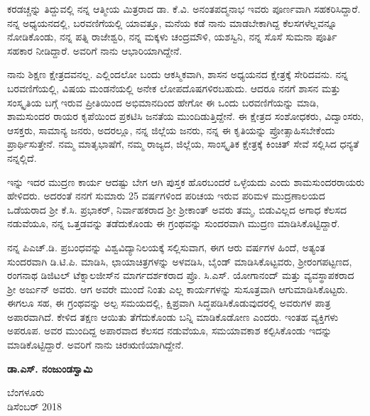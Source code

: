 ಕರಡಚ್ಚನ್ನು ತಿದ್ದುವಲ್ಲಿ ನನ್ನ ಆತ್ಮೀಯ ಮಿತ್ರರಾದ ಡಾ. ಕೆ.ವಿ. ಅನಂತಪದ್ಮನಾಭ ಇವರು ಪೂರ್ಣವಾಗಿ ಸಹಕರಿಸಿದ್ದಾರೆ. ನನ್ನ ಅಧ್ಯಯನದಲ್ಲಿ, ಬರವಣಿಗೆಯಲ್ಲಿ ಯಾವತ್ತೂ, ಮನೆಯ ಕಡೆ ನಾನು ಮಾಡಬೇಕಾಗಿದ್ದ ಕೆಲಸಗಳೆಲ್ಲವನ್ನೂ ನೋಡಿಕೊಂಡು, ನನ್ನ ಪತ್ನಿ ರಾಜೇಶ್ವರಿ, ನನ್ನ ಮಕ್ಕಳು ಚಂದ್ರಮೌಳಿ, ಯಶಸ್ವಿನಿ, ನನ್ನ ಸೊಸೆ ಸುಮನಾ ಪೂರ್ತಿ ಸಹಕಾರ ನೀಡಿದ್ದಾರೆ. ಅವರಿಗೆ ನಾನು ಆಭಾರಿಯಾಗಿದ್ದೇನೆ. 

ನಾನು ಶಿಕ್ಷಣ ಕ್ಷೇತ್ರದವನಲ್ಲ. ಎಲ್ಲಿಂದಲೋ ಬಂದು ಆಕಸ್ಮಿಕವಾಗಿ, ಶಾಸನ ಅಧ್ಯಯನದ ಕ್ಷೇತ್ರಕ್ಕೆ ಸೇರಿದವನು. ನನ್ನ ಬರವಣಿಗೆಯಲ್ಲಿ, ವಿಷಯ ಮಂಡನೆಯಲ್ಲಿ ಅನೇಕ ಲೋಪದೊಷಗಳಿರಬಹುದು. ಆದರೂ ನನಗೆ ಶಾಸನ ಮತ್ತು ಸಂಸ್ಕೃತಿಯ ಬಗ್ಗೆ ಇರುವ ಪ್ರೀತಿಯಿಂದ ಅಭಿಮಾನದಿಂದ ಹೇಗೋ ಈ ಒಂದು ಬರವಣಿಗೆಯನ್ನು ಮಾಡಿ, ಶಾಮಸುಂದರ ರಾಯರ ಕೃಪೆಯಿಂದ ಪ್ರಕಟಿಸಿ ಜನತೆಯ ಮುಂದಿಡುತ್ತಿದ್ದೇನೆ. ಈ ಕ್ಷೇತ್ರದ ಸಂಶೋಧಕರು, ವಿದ್ವಾಂಸರು, ಆಸಕ್ತರು, ಸಾಮಾನ್ಯ ಜನರು, ಅದರಲ್ಲೂ, ನನ್ನ ಜಿಲ್ಲೆಯ ಜನರು, ನನ್ನ ಈ ಕೃತಿಯನ್ನು ಪ್ರೋತ್ಸಾಹಿಸಬೇಕೆಂದು ಪ್ರಾರ್ಥಿಸುತ್ತೇನೆ. ನಮ್ಮ ಮಾತೃಭಾಷೆಗೆ, ನಮ್ಮ ರಾಜ್ಯದ, ಜಿಲ್ಲೆಯ, ಸಾಂಸ್ಕೃತಿಕ ಕ್ಷೇತ್ರಕ್ಕೆ ಕಿಂಚಿತ್​ ಸೇವೆ ಸಲ್ಲಿಸಿದ ಧನ್ಯತೆ ನನ್ನಲ್ಲಿದೆ.

ಇನ್ನು ಇದರ ಮುದ್ರಣ ಕಾರ್ಯ ಆದಷ್ಟು ಬೇಗ ಆಗಿ ಪುಸ್ತಕ ಹೊರಬಂದರೆ ಒಳ್ಳೆಯದು ಎಂದು ಶಾಮಸುಂದರರಾಯರು ಹೇಳಿದರು. ಅದರಂತೆ ನನಗೆ ಸುಮಾರು 25 ವರ್ಷಗಳಿಂದ ಪರಿಚಯ ಇರುವ ಪರಿಮಳ ಮುದ್ರಣಾಲಯದ ಒಡೆಯರಾದ ಶ‍್ರೀ ಕೆ.ಸಿ. ಪ್ರಭಾಕರ್​, ನಿರ್ವಾಹಕರಾದ ಶ‍್ರೀ ಶ‍್ರೀಕಾಂತ್​ ಅವರು ತಮ್ಮ, ಬಿಡುವಿಲ್ಲದ ಅಗಾಧ ಕೆಲಸದ ನಡುವೆಯೂ, ನನ್ನ ಒತ್ತಡವನ್ನು ತಡೆದುಕೊಂಡು ಈ ಗ್ರಂಥವನ್ನು ಸುಂದರವಾಗಿ ಮುದ್ರಣ ಮಾಡಿಸಿಕೊಟ್ಟಿದ್ದಾರೆ.

ನನ್ನ ಪಿಎಚ್​.ಡಿ. ಪ್ರಬಂಧವನ್ನು ವಿಶ್ವವಿದ್ಯಾನಿಲಯಕ್ಕೆ ಸಲ್ಲಿಸುವಾಗ, ಈಗ ಆರು ವರ್ಷಗಳ ಹಿಂದೆ, ಅತ್ಯಂತ ಸುಂದರವಾಗಿ ಡಿ.ಟಿ.ಪಿ. ಮಾಡಿಸಿ, ಛಾಯಾಚಿತ್ರಗಳನ್ನು ಅಳವಡಿಸಿ, ಬೈಂಡ್​ ಮಾಡಿಸಿಕೊಟ್ಟವರು, ಶ‍್ರೀರಂಗಪಟ್ಟಣದ, ರಂಗನಾಥ ಡಿಜಿಟಲ್​ ಟೆಕ್ನಾಲಜೀಸ್​ನ ಮಾರ್ಗದರ್ಶಕರಾದ ಪ್ರೊ. ಸಿ.ಎಸ್​. ಯೋಗಾನಂದ್​ ಮತ್ತು ವ್ಯವಸ್ಥಾಪಕರಾದ ಶ‍್ರೀ ಅರ್ಜುನ್​ ಅವರು. ಆಗ ಅವರೇ ಮುಂದೆ ನಿಂತು ಎಲ್ಲ ಕಾರ್ಯಗಳನ್ನು ಸುಸೂತ್ರವಾಗಿ ಆಗುಮಾಡಿಸಿಕೊಟ್ಟರು. ಈಗಲೂ ಸಹ, ಈ ಗ್ರಂಥವನ್ನು ಅಲ್ಪ ಸಮಯದಲ್ಲಿ, ಕ್ಷಿಪ್ರವಾಗಿ ಸಿದ್ಧಪಡಿಸಿಕೊಡುವುದರಲ್ಲಿ ಅವರುಗಳ ಪಾತ್ರ ಅಪಾರವಾಗಿದೆ. ಕೇಳಿದ ತಕ್ಷಣ ಆಯಿತು ತೆಗೆದುಕೊಂಡು ಬನ್ನಿ ಮಾಡಿಕೊಡೋಣ ಎಂದರು. ಇಂತಹ ವ್ಯಕ್ತಿಗಳು ಅಪರೂಪ. ಅವರ ಮುಂದಿದ್ದ ಅಪಾರವಾದ ಕೆಲಸದ ನಡುವೆಯೂ, ಸಮಯಾವಕಾಶ ಕಲ್ಪಿಸಿಕೊಂಡು ಇದನ್ನು ಮಾಡಿಕೊಟ್ಟಿದ್ದಾರೆ. ಅವರಿಗೆ ನಾನು ಚಿರಋಣಿಯಾಗಿದ್ದೇನೆ.

\begin{flushright}
\textbf{ಡಾ.ಎಸ್​. ನಂಜುಂಡಸ್ವಾಮಿ}
\end{flushright}

ಬೆಂಗಳೂರು \\ ಡಿಸೆಂಬರ್​ 2018


